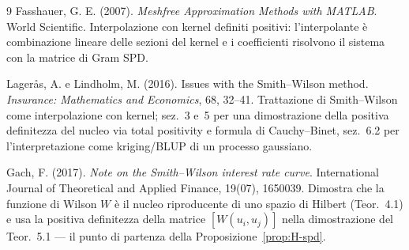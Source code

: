 \documentclass[11pt,a4paper]{article}
\theoremstyle{plain}
\theoremstyle{definition}
\theoremstyle{remark}
\begin{document}
\begin{thebibliography}{9}
Fasshauer, G. E. (2007).
\textit{Meshfree Approximation Methods with MATLAB}. World Scientific.
Interpolazione con kernel definiti positivi: l'interpolante \`e combinazione lineare delle
sezioni del kernel e i coefficienti risolvono il sistema con la matrice di Gram SPD.

Lager\aa s, A. e Lindholm, M. (2016).
Issues with the Smith--Wilson method.
\textit{Insurance: Mathematics and Economics}, 68, 32--41.
Trattazione di Smith--Wilson come interpolazione con kernel; sez.~3 e~5 per una dimostrazione
della positiva definitezza del nucleo via total positivity e formula di Cauchy--Binet,
sez.~6.2 per l'interpretazione come kriging/BLUP di un processo gaussiano.

Gach, F. (2017).
\textit{Note on the Smith--Wilson interest rate curve}.
International Journal of Theoretical and Applied Finance, 19(07), 1650039.
Dimostra che la funzione di Wilson $W$ \`e il nucleo riproducente di uno spazio di Hilbert
(Teor.~4.1) e usa la positiva definitezza della matrice $[W(u_i,u_j)]$ nella dimostrazione
del Teor.~5.1 --- il punto di partenza della Proposizione~\ref{prop:H-spd}.

\end{thebibliography}
\end{document}
